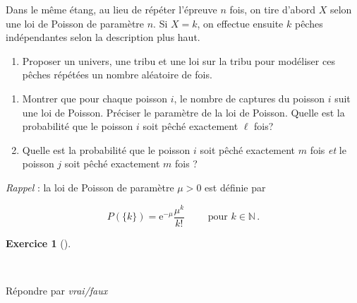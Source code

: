 \documentclass[
  french,
  11pt,
  a4paper,
  twoside,
  article,
  titlepage=false]{memoir}
\providecommand{\tightlist}{%
  \setlength{\itemsep}{0pt}\setlength{\parskip}{0pt}}
\theoremstyle{definition}
\newtheorem{exercise}{Exercice}[section]
\theoremstyle{remark}
\begin{document}
Dans le même étang, au lieu de répéter l'épreuve \(n\) fois, on tire
d'abord \(X\) selon une loi de Poisson de paramètre \(n\). Si \(X=k\),
on effectue ensuite \(k\) pêches indépendantes selon la description plus
haut.

\begin{enumerate}
\def\labelenumi{\alph{enumi}.}
\setcounter{enumi}{21}
\tightlist
\item
  Proposer un univers, une tribu et une loi sur la tribu pour modéliser
  ces pêches répétées un nombre aléatoire de fois.
\end{enumerate}

\begin{enumerate}
\def\labelenumi{\roman{enumi}.}
\setcounter{enumi}{5}
\tightlist
\item
  Montrer que pour chaque poisson \(i\), le nombre de captures du
  poisson \(i\) suit une loi de Poisson. Préciser le paramètre de la loi
  de Poisson. Quelle est la probabilité que le poisson \(i\) soit pêché
  exactement \(\ell\) fois?
\item
  Quelle est la probabilité que le poisson \(i\) soit pêché exactement
  \(m\) fois \emph{et} le poisson \(j\) soit pêché exactement \(m\) fois
  ?
\end{enumerate}

\emph{Rappel} : la loi de Poisson de paramètre \(\mu>0\) est définie par

\[P(\{k\}) =  \mathrm{e}^{-\mu} \frac{\mu^k}{k!} \qquad \text{ pour } k \in \mathbb{N}\, .\]

\begin{exercise}[]\protect\hypertarget{exr-3-b}{}\label{exr-3-b}

~

\end{exercise}

Répondre par \emph{vrai/faux}
\end{document}
